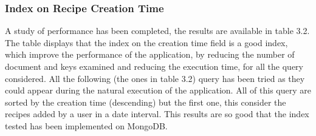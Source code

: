 \documentclass[a4paper]{report}
\begin{document}
\subsubsection{Index on Recipe Creation Time}
A study of performance has been completed, the results are available in table 3.2. The table displays that the index on the creation time field is a good index, which improve the performance of the application, by reducing the number of document and keys examined and reducing the execution time, for all the query considered. All the following (the ones in table 3.2) query has been tried as they could appear during the natural execution of the application. All of this query are sorted by the creation time (descending) but the first one, this consider the recipes added by a user in a date interval. This results are so good that the index tested has been implemented on MongoDB.
\end{document}
